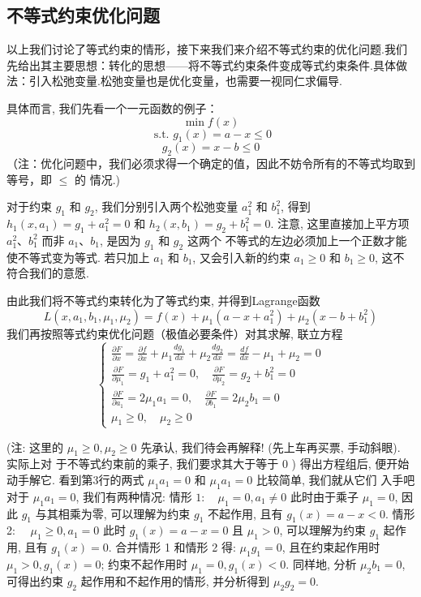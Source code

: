 \subsection{不等式约束优化问题}

以上我们讨论了等式约束的情形，接下来我们来介绍不等式约束的优化问题.我们先给出其主要思想：转化的思想——将不等式约束条件变成等式约束条件.具体做法：引入松弛变量.松弛变量也是优化变量，也需要一视同仁求偏导.

具体而言, 我们先看一个一元函数的例子：
$$
\min f(x)
$$
$$
\text { s.t. } g_{1}(x)=a-x \leq 0
$$
$$
g_{2}(x)=x-b \leq 0
$$
（注：优化问题中，我们必须求得一个确定的值，因此不妨令所有的不等式均取到等号，即 $ \leq $ 的 情况.)

对于约束 $ g_{1} $ 和 $ g_{2} $, 我们分别引入两个松弛变量 $ a_{1}^{2} $ 和 $ b_{1}^{2} $, 得到 $ h_{1}\left(x, a_{1}\right)=g_{1}+a_{1}^{2}=0 $ 和 $ h_{2}\left(x, b_{1}\right)=g_{2}+b_{1}^{2}=0 $. 注意, 这里直接加上平方项 $ a_{1}^{2} 、 b_{1}^{2} $ 而非 $ a_{1} 、 b_{1} $, 是因为 $ g_{1} $ 和 $ g_{2} $ 这两个 不等式的左边必须加上一个正数才能使不等式变为等式. 若只加上 $ a_{1} $ 和 $ b_{1} $, 又会引入新的约束 $ a_{1} \geq 0 $ 和 $ b_{1} \geq 0 $, 这不符合我们的意愿.



由此我们将不等式约束转化为了等式约束, 并得到Lagrange函数
$$
L\left(x, a_{1}, b_{1}, \mu_{1}, \mu_{2}\right)=f(x)+\mu_{1}\left(a-x+a_{1}^{2}\right)+\mu_{2}\left(x-b+b_{1}^{2}\right)
$$
我们再按照等式约束优化问题（极值必要条件）对其求解, 联立方程
$$
\left\{\begin{array}{l}
\frac{\partial F}{\partial x}=\frac{\partial f}{\partial x}+\mu_{1} \frac{d g_{1}}{d x}+\mu_{2} \frac{d g_{2}}{d x}=\frac{d f}{d x}-\mu_{1}+\mu_{2}=0 \\
\frac{\partial F}{\partial \mu_{1}}=g_{1}+a_{1}^{2}=0, \quad \frac{\partial F}{\partial \mu_{2}}=g_{2}+b_{1}^{2}=0 \\
\frac{\partial F}{\partial a_{1}}=2 \mu_{1} a_{1}=0, \quad \frac{\partial F}{\partial b_{1}}=2 \mu_{2} b_{1}=0 \\
\mu_{1} \geq 0, \quad \mu_{2} \geq 0
\end{array}\right.
$$

(注: 这里的 $\mu_{1} \geq 0, \mu_{2} \geq 0$ 先承认, 我们待会再解释! (先上车再买票, 手动斜眼). 实际上对 于不等式约束前的乘子, 我们要求其大于等于 0 )
得出方程组后, 便开始动手解它. 看到第3行的两式 $\mu_{1} a_{1}=0$ 和 $\mu_{1} a_{1}=0$ 比较简单, 我们就从它们 入手吧
对于 $\mu_{1} a_{1}=0$, 我们有两种情况:
情形 $1: \quad \mu_{1}=0, a_{1} \neq 0$
此时由于乘子 $\mu_{1}=0$, 因此 $g_{1}$ 与其相乘为零, 可以理解为约束 $g_{1}$ 不起作用, 且有 $g_{1}(x)=a-x<0 .$
情形2: $\quad \mu_{1} \geq 0, a_{1}=0$
此时 $g_{1}(x)=a-x=0$ 且 $\mu_{1}>0$, 可以理解为约束 $g_{1}$ 起作用, 且有 $g_{1}(x)=0$.
合并情形 1 和情形 2 得: $\mu_{1} g_{1}=0$, 且在约束起作用时 $\mu_{1}>0, g_{1}(x)=0$; 约束不起作用时 $\mu_{1}=0, g_{1}(x)<0 .$
同样地, 分析 $\mu_{2} b_{1}=0$, 可得出约束 $g_{2}$ 起作用和不起作用的情形, 并分析得到 $\mu_{2} g_{2}=0$.

